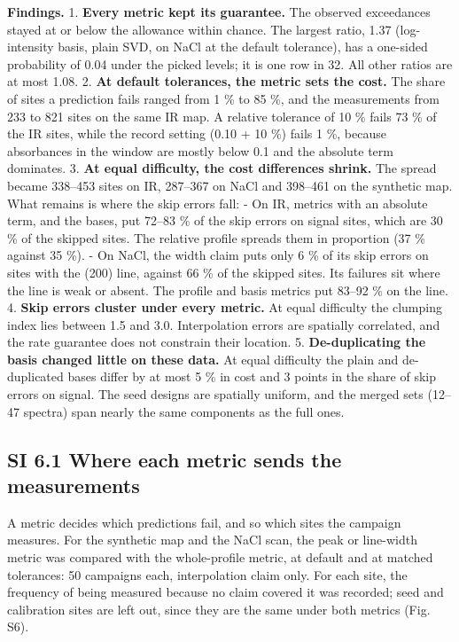 \documentclass{iopjournal}
\begin{document}
\textbf{Findings.} 1. \textbf{Every metric kept its guarantee.} The observed exceedances stayed at or below the allowance within chance. The largest ratio, 1.37 (log-intensity basis, plain SVD, on NaCl at the default tolerance), has a one-sided probability of 0.04 under the picked levels; it is one row in 32. All other ratios are at most 1.08. 2. \textbf{At default tolerances, the metric sets the cost.} The share of sites a prediction fails ranged from 1 \% to 85 \%, and the measurements from 233 to 821 sites on the same IR map. A relative tolerance of 10 \% fails 73 \% of the IR sites, while the record setting (0.10 + 10 \%) fails 1 \%, because absorbances in the window are mostly below 0.1 and the absolute term dominates. 3. \textbf{At equal difficulty, the cost differences shrink.} The spread became 338--453 sites on IR, 287--367 on NaCl and 398--461 on the synthetic map. What remains is where the skip errors fall: - On IR, metrics with an absolute term, and the bases, put 72--83 \% of the skip errors on signal sites, which are 30 \% of the skipped sites. The relative profile spreads them in proportion (37 \% against 35 \%). - On NaCl, the width claim puts only 6 \% of its skip errors on sites with the (200) line, against 66 \% of the skipped sites. Its failures sit where the line is weak or absent. The profile and basis metrics put 83--92 \% on the line. 4. \textbf{Skip errors cluster under every metric.} At equal difficulty the clumping index lies between 1.5 and 3.0. Interpolation errors are spatially correlated, and the rate guarantee does not constrain their location. 5. \textbf{De-duplicating the basis changed little on these data.} At equal difficulty the plain and de-duplicated bases differ by at most 5 \% in cost and 3 points in the share of skip errors on signal. The seed designs are spatially uniform, and the merged sets (12--47 spectra) span nearly the same components as the full ones.

\hypertarget{si-6.1-where-each-metric-sends-the-measurements}{%
\subsection*{SI 6.1 Where each metric sends the measurements}\label{si-6.1-where-each-metric-sends-the-measurements}}

A metric decides which predictions fail, and so which sites the campaign measures. For the synthetic map and the NaCl scan, the peak or line-width metric was compared with the whole-profile metric, at default and at matched tolerances: 50 campaigns each, interpolation claim only. For each site, the frequency of being measured because no claim covered it was recorded; seed and calibration sites are left out, since they are the same under both metrics (Fig. S6).
\end{document}
